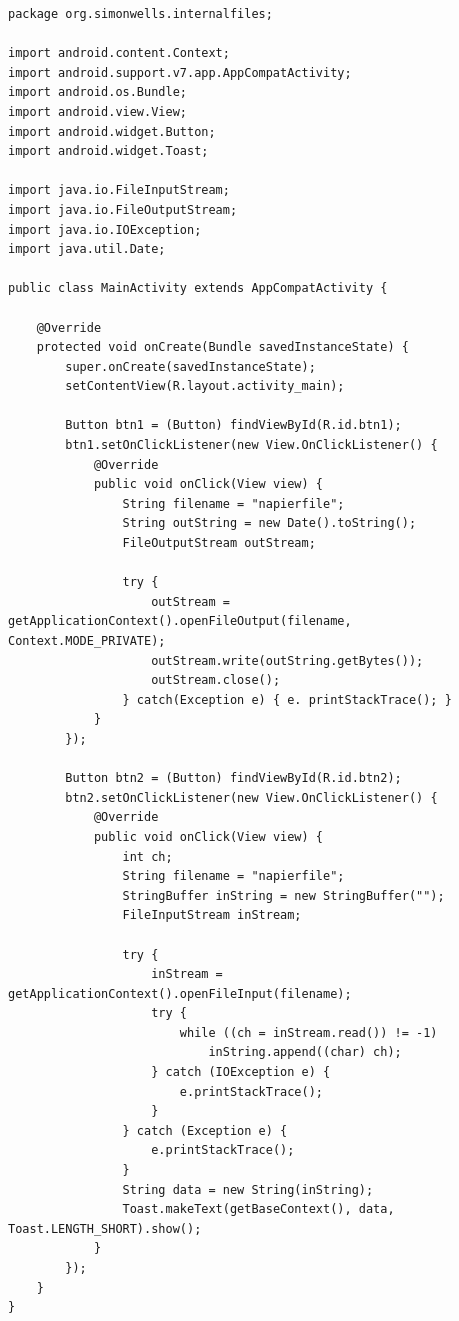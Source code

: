 \begin{lstlisting}
package org.simonwells.internalfiles;

import android.content.Context;
import android.support.v7.app.AppCompatActivity;
import android.os.Bundle;
import android.view.View;
import android.widget.Button;
import android.widget.Toast;

import java.io.FileInputStream;
import java.io.FileOutputStream;
import java.io.IOException;
import java.util.Date;

public class MainActivity extends AppCompatActivity {

    @Override
    protected void onCreate(Bundle savedInstanceState) {
        super.onCreate(savedInstanceState);
        setContentView(R.layout.activity_main);

        Button btn1 = (Button) findViewById(R.id.btn1);
        btn1.setOnClickListener(new View.OnClickListener() {
            @Override
            public void onClick(View view) {
                String filename = "napierfile";
                String outString = new Date().toString();
                FileOutputStream outStream;

                try {
                    outStream = getApplicationContext().openFileOutput(filename, Context.MODE_PRIVATE);
                    outStream.write(outString.getBytes());
                    outStream.close();
                } catch(Exception e) { e. printStackTrace(); }
            }
        });

        Button btn2 = (Button) findViewById(R.id.btn2);
        btn2.setOnClickListener(new View.OnClickListener() {
            @Override
            public void onClick(View view) {
                int ch;
                String filename = "napierfile";
                StringBuffer inString = new StringBuffer("");
                FileInputStream inStream;

                try {
                    inStream = getApplicationContext().openFileInput(filename);
                    try {
                        while ((ch = inStream.read()) != -1)
                            inString.append((char) ch);
                    } catch (IOException e) {
                        e.printStackTrace();
                    }
                } catch (Exception e) {
                    e.printStackTrace();
                }
                String data = new String(inString);
                Toast.makeText(getBaseContext(), data, Toast.LENGTH_SHORT).show();
            }
        });
    }
}
\end{lstlisting}

